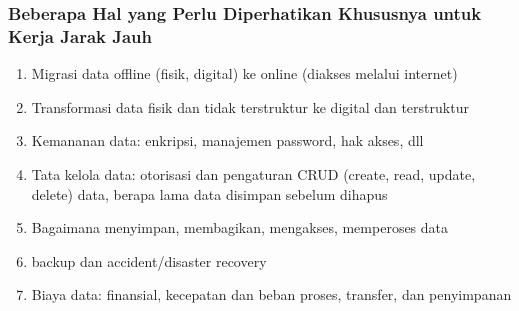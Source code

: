 \documentclass[aspectratio=169]{beamer}
\begin{document}
	
	\begin{frame}
		\frametitle{Beberapa Hal yang Perlu Diperhatikan Khususnya untuk Kerja Jarak Jauh}
		\begin{enumerate}
			\item Migrasi data offline (fisik, digital) ke online (diakses melalui internet)
			\item Transformasi data fisik dan tidak terstruktur ke digital dan terstruktur
			\item Kemananan data: enkripsi, manajemen password, hak akses, dll
			\item Tata kelola data: otorisasi dan pengaturan CRUD (create, read, update, delete) data, berapa lama data disimpan sebelum dihapus
			\item Bagaimana menyimpan, membagikan, mengakses, memperoses data
			\item backup dan accident/disaster recovery
			\item Biaya data: finansial, kecepatan dan beban proses, transfer, dan penyimpanan
		\end{enumerate}
	\end{frame}
	
	
	
\end{document}
